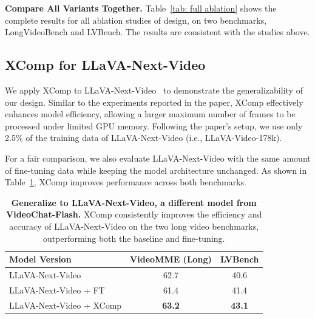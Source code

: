\noindent
\textbf{Compare All Variants Together.} \;\; Table~\ref{tab: full ablation} shows the complete results for all ablation studies of \name design, on two benchmarks, LongVideoBench and LVBench. The results are consistent with the studies above.




\subsection{XComp for LLaVA-Next-Video}

We apply XComp to LLaVA-Next-Video~\citep{zhang2024videoinstructiontuningsynthetic} to demonstrate the generalizability of our design. Similar to the experiments reported in the paper, XComp effectively enhances model efficiency, allowing a larger maximum number of frames to be processed under limited GPU memory. Following the paper’s setup, we use only 2.5\% of the training data of LLaVA-Next-Video (i.e., LLaVA-Video-178k).

For a fair comparison, we also evaluate LLaVA-Next-Video with the same amount of fine-tuning data while keeping the model architecture unchanged. As shown in Table~\ref{tab: llava}, XComp improves performance across both benchmarks. 

\begin{table}[h]
\centering
\caption{\textbf{Generalize to LLaVA-Next-Video, a different model from VideoChat-Flash.} XComp consistently improves the efficiency and accuracy of LLaVA-Next-Video on the two long video benchmarks, outperforming both the baseline and fine-tuning.}
\label{tab: llava}
\vspace{3pt}
\begin{tabular}{lcc}
\toprule
Model Version & VideoMME (Long) & LVBench \\
\midrule
LLaVA-Next-Video                 & 62.7 & 40.6 \\
LLaVA-Next-Video + FT & 61.4 & 41.4 \\
LLaVA-Next-Video + XComp          & \textbf{63.2} & \textbf{43.1} \\
\bottomrule
\end{tabular}
\end{table}
